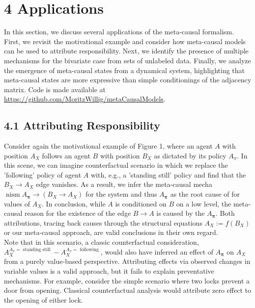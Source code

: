 \documentclass[10pt]{article}
\begin{document}
\section*{4 Applications}
In this section, we discuss several applications of the meta-causal formalism. First, we revisit the motivational example and consider how meta-causal models can be used to attribute responsibility. Next, we identify the presence of multiple mechanisms for the bivariate case from sets of unlabeled data. Finally, we analyze the emergence of meta-causal states from a dynamical system, highlighting that meta-causal states are more expressive than simple conditionings of the adjacency matrix. Code is made available at \href{https://github.com/MoritzWillig/metaCausalModels}{https://github.com/MoritzWillig/metaCausalModels}.

\subsection*{4.1 Attributing Responsibility}
Consider again the motivational example of Figure 1, where an agent $A$ with position $A_{X}$ follows an agent $B$ with position $B_{X}$ as dictated by its policy $A_{\pi}$. In this scene, we can imagine counterfactual scenario in which we replace the 'following' policy of agent $A$ with, e.g., a 'standing still' policy and find that the $B_{X} \rightarrow A_{X}$ edge vanishes. As a result, we infer the meta-causal mecha$\operatorname{nism} A_{\boldsymbol{\pi}} \rightarrow\left(B_{X} \rightarrow A_{X}\right)$ for the system and thus $A_{\boldsymbol{\pi}}$ as the root cause of for values of $A_{X}$. In conclusion, while $A$ is conditioned on $B$ on a low level, the meta-causal reason for the existence of the edge $B \rightarrow A$ is caused by the $A_{\boldsymbol{\pi}}$. Both attributions, tracing back causes through the structural equations $A_{X}:=f\left(B_{X}\right)$ or our meta-causal approach, are valid conclusions in their own regard.\\
Note that in this scenario, a classic counterfactual consideration, $A_{X}^{A_{\pi}=\text { standing still }}-A_{X}^{A_{\pi}=\text { following }}$, would also have inferred an effect of $A_{\boldsymbol{\pi}}$ on $A_{X}$ from a purely value-based perspective. Attributing effects via observed changes in variable values is a valid approach, but it fails to explain preventative mechanisms. For example, consider the simple scenario where two locks prevent a door from opening. Classical counterfactual analysis would attribute zero effect to the opening of either lock.
\end{document}
